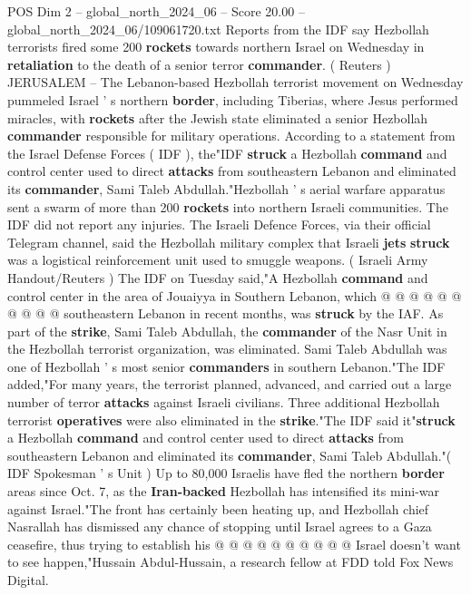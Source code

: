 \begin{textsample}{POS Dim 2 – global\_north\_2024\_06 – Score 20.00 – global\_north\_2024\_06/109061720.txt}  \label{ex:f2_pos_318}
Reports from the IDF say Hezbollah terrorists fired some 200 \textbf{rockets} towards northern Israel on Wednesday in \textbf{retaliation} to the death of a senior terror \textbf{commander}. ( Reuters ) JERUSALEM -- The Lebanon-based Hezbollah terrorist movement on Wednesday pummeled Israel ' s northern \textbf{border}, including Tiberias, where Jesus performed miracles, with \textbf{rockets} after the Jewish state eliminated a senior Hezbollah \textbf{commander} responsible for military operations.
According to a statement from the Israel Defense Forces ( IDF ), the"IDF \textbf{struck} a Hezbollah \textbf{command} and control center used to direct \textbf{attacks} from southeastern Lebanon and eliminated its \textbf{commander}, Sami Taleb Abdullah."Hezbollah ' s aerial warfare apparatus sent a swarm of more than 200 \textbf{rockets} into northern Israeli communities.
The IDF did not report any injuries.
The Israeli Defence Forces, via their official Telegram channel, said the Hezbollah military complex that Israeli \textbf{jets} \textbf{struck} was a logistical reinforcement unit used to smuggle weapons. ( Israeli Army Handout/Reuters ) The IDF on Tuesday said,"A Hezbollah \textbf{command} and control center in the area of Jouaiyya in Southern Lebanon, which @ @ @ @ @ @ @ @ @ @ southeastern Lebanon in recent months, was \textbf{struck} by the IAF.
As part of the \textbf{strike}, Sami Taleb Abdullah, the \textbf{commander} of the Nasr Unit in the Hezbollah terrorist organization, was eliminated.
Sami Taleb Abdullah was one of Hezbollah ' s most senior \textbf{commanders} in southern Lebanon."The IDF added,"For many years, the terrorist planned, advanced, and carried out a large number of terror \textbf{attacks} against Israeli civilians.
Three additional Hezbollah terrorist \textbf{operatives} were also eliminated in the \textbf{strike}."The IDF said it"\textbf{struck} a Hezbollah \textbf{command} and control center used to direct \textbf{attacks} from southeastern Lebanon and eliminated its \textbf{commander}, Sami Taleb Abdullah."( IDF Spokesman ' s Unit ) Up to 80,000 Israelis have fled the northern \textbf{border} areas since Oct. 7, as the \textbf{Iran-backed} Hezbollah has intensified its mini-war against Israel."The front has certainly been heating up, and Hezbollah chief Nasrallah has dismissed any chance of stopping until Israel agrees to a Gaza ceasefire, thus trying to establish his @ @ @ @ @ @ @ @ @ @ Israel doesn't want to see happen,"Hussain Abdul-Hussain, a research fellow at FDD told Fox News Digital.

\end{textsample}
